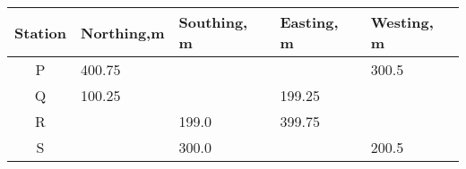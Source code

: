 \begin{tabular}{|c|p{1.5cm}|p{1.5cm}|p{1.5cm}|p{1.5cm}|}
    \hline
    Station & Northing,m & Southing, m & Easting, m & Westing, m\\
    \hline
    P & 400.75 &  &  & 300.5 \\
    \hline
    Q & 100.25 &  & 199.25 &  \\
    \hline
    R &  & 199.0 & 399.75 &  \\
    \hline
    S &  & 300.0 &  & 200.5 \\
    \hline
\end{tabular}
